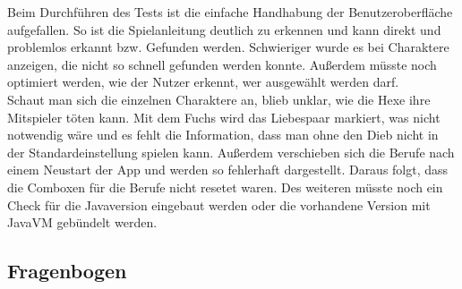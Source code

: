Beim Durchführen des Tests ist die einfache Handhabung der
Benutzeroberfläche aufgefallen. So ist die Spielanleitung deutlich zu
erkennen und kann direkt und problemlos erkannt bzw. Gefunden werden.
Schwieriger wurde es bei Charaktere anzeigen, die nicht so schnell
gefunden werden konnte. Außerdem müsste noch optimiert werden, wie der Nutzer
erkennt, wer ausgewählt werden darf. \\
Schaut man sich die einzelnen Charaktere an, blieb unklar, wie die Hexe
ihre Mitspieler töten kann. Mit dem Fuchs wird das Liebespaar markiert,
was nicht notwendig wäre und es fehlt die Information, dass man ohne den
Dieb nicht in der Standardeinstellung spielen kann. Außerdem verschieben
sich die Berufe nach einem Neustart der App und werden so fehlerhaft
dargestellt. Daraus folgt, dass die Comboxen für die Berufe nicht
resetet waren. Des weiteren müsste noch ein Check für die Javaversion
eingebaut werden oder die vorhandene Version mit JavaVM gebündelt werden.

\subsection{Fragenbogen}

